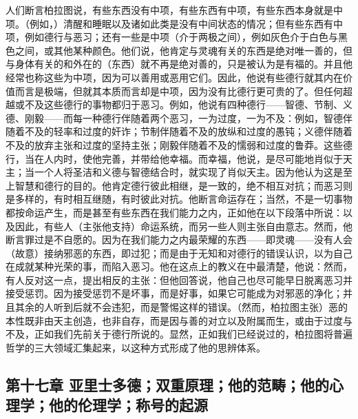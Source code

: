 人们断言柏拉图说，有些东西没有中项，有些东西有中项，有些东西本身就是中项。（例如，）清醒和睡眠以及诸如此类是没有中间状态的情况；但有些东西有中项，例如德行与恶习；还有一些是中项（介于两极之间），例如灰色介于白色与黑色之间，或其他某种颜色。他们说，他肯定与灵魂有关的东西是绝对唯一善的，但与身体有关的和外在的（东西）就不再是绝对善的，只是被认为是有福的。并且他经常也称这些为中项，因为可以善用或恶用它们。因此，他说有些德行就其内在价值而言是极端，但就其本质而言却是中项，因为没有比德行更可贵的了。但任何超越或不及这些德行的事物都归于恶习。例如，他说有四种德行——智德、节制、义德、刚毅——而每一种德行伴随着两个恶习，一为过度，一为不及：例如，智德伴随着不及的轻率和过度的奸诈；节制伴随着不及的放纵和过度的愚钝；义德伴随着不及的放弃主张和过度的坚持主张；刚毅伴随着不及的懦弱和过度的鲁莽。这些德行，当在人内时，使他完善，并带给他幸福。而幸福，他说，是尽可能地肖似于天主；当一个人将圣洁和义德与智德结合时，就实现了肖似天主。因为他认为这是至上智慧和德行的目的。他肯定德行彼此相继，是一致的，绝不相互对抗；而恶习则是多样的，有时相互继随，有时彼此对抗。他断言命运存在；当然，不是一切事物都按命运产生，而是甚至有些东西在我们能力之内，正如他在以下段落中所说：以及因此，有些人（主张他支持）命运系统，而另一些人则主张自由意志。然而，他断言罪过是不自愿的。因为在我们能力之内最荣耀的东西——即灵魂——没有人会（故意）接纳邪恶的东西，即过犯；而是由于无知和对德行的错误认识，以为自己在成就某种光荣的事，而陷入恶习。他在这点上的教义在中最清楚，他说：然而，有人反对这一点，提出相反的主张：但他回答说，他自己也尽可能早日脱离恶习并接受惩罚。因为接受惩罚不是坏事，而是好事，如果它可能成为对邪恶的净化；并且其余的人听到后就不会违犯，而是警惕这样的错误。（然而，柏拉图主张）恶的本性既非由天主创造，也非自存，而是因与善的对立以及附属而生，或由于过度与不及，正如我们先前关于德行所说的。显然，正如我们已经说过的，柏拉图将普遍哲学的三大领域汇集起来，以这种方式形成了他的思辨体系。\par


\subsection{第十七章 亚里士多德；双重原理；他的范畴；他的心理学；他的伦理学；称号的起源}

